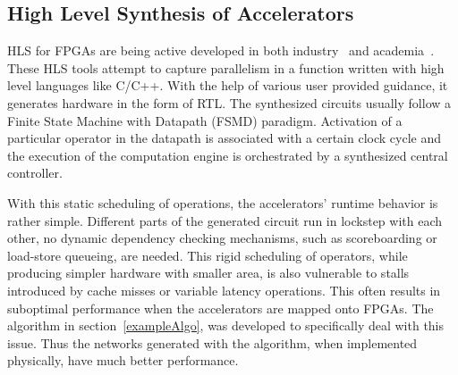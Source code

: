 \documentclass{sig-alternate}
\begin{document}
\subsection{High Level Synthesis of Accelerators}
\label{pre2}
HLS for FPGAs are being active developed in both industry~\cite{tools:vivadohls} and academia~\cite{tools:legup}.
These HLS tools attempt to capture parallelism in a function written with high level languages like C/C++. With the help of various user provided guidance, it generates hardware in the form of RTL. 
The synthesized circuits usually follow a Finite State Machine with Datapath (FSMD) paradigm. Activation of a particular operator in the datapath is associated
with a certain clock cycle and the execution of the computation engine is orchestrated by a synthesized central controller. 

With this static scheduling of operations, the accelerators' runtime behavior is rather simple. Different parts
of the generated circuit run in lockstep with each other, no dynamic dependency checking mechanisms,
such as scoreboarding or load-store queueing, are needed.
This rigid scheduling of operators, while producing simpler hardware with smaller area,
is also vulnerable to stalls introduced by cache misses or variable latency operations.
This often results in suboptimal performance when the accelerators
are mapped onto FPGAs. The algorithm in section~\ref{exampleAlgo}, was developed to
specifically deal with this issue. Thus the networks generated with the algorithm, when implemented physically, have much better performance. 

\end{document}
